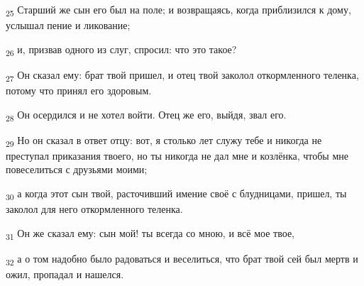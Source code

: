 \begin{tcolorbox}
\textsubscript{25} Старший же сын его был на поле; и возвращаясь, когда приблизился к дому, услышал пение и ликование;
\end{tcolorbox}
\begin{tcolorbox}
\textsubscript{26} и, призвав одного из слуг, спросил: что это такое?
\end{tcolorbox}
\begin{tcolorbox}
\textsubscript{27} Он сказал ему: брат твой пришел, и отец твой заколол откормленного теленка, потому что принял его здоровым.
\end{tcolorbox}
\begin{tcolorbox}
\textsubscript{28} Он осердился и не хотел войти. Отец же его, выйдя, звал его.
\end{tcolorbox}
\begin{tcolorbox}
\textsubscript{29} Но он сказал в ответ отцу: вот, я столько лет служу тебе и никогда не преступал приказания твоего, но ты никогда не дал мне и козлёнка, чтобы мне повеселиться с друзьями моими;
\end{tcolorbox}
\begin{tcolorbox}
\textsubscript{30} а когда этот сын твой, расточивший имение своё с блудницами, пришел, ты заколол для него откормленного теленка.
\end{tcolorbox}
\begin{tcolorbox}
\textsubscript{31} Он же сказал ему: сын мой! ты всегда со мною, и всё мое твое,
\end{tcolorbox}
\begin{tcolorbox}
\textsubscript{32} а о том надобно было радоваться и веселиться, что брат твой сей был мертв и ожил, пропадал и нашелся.
\end{tcolorbox}
